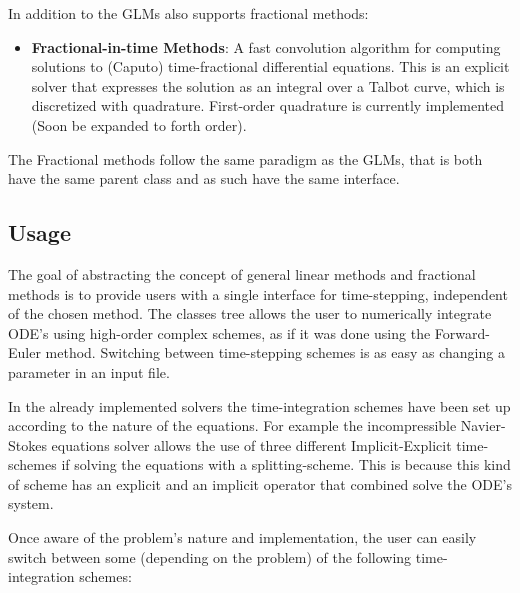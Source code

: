 In addition to the GLMs {\nek} also supports fractional methods:
\begin{itemize}
  \item \textbf{Fractional-in-time Methods}: A fast convolution
    algorithm for computing solutions to (Caputo) time-fractional
    differential equations. This is an explicit solver that expresses
    the solution as an integral over a Talbot curve, which is
    discretized with quadrature. First-order quadrature is currently
    implemented (Soon be expanded to forth order).
\end{itemize}

The Fractional methods follow the same paradigm as the GLMs, that is
both have the same parent class and as such have the same interface.

\subsection{Usage}
The goal of abstracting the concept of general linear methods and
fractional methods is to provide users with a single interface for
time-stepping, independent of the chosen method. The classes tree
allows the user to numerically integrate ODE's using high-order
complex schemes, as if it was done using the Forward-Euler method.
Switching between time-stepping schemes is as easy as changing a
parameter in an input file.

In the already implemented solvers the time-integration schemes have
been set up according to the nature of the equations.  For example the
incompressible Navier-Stokes equations solver allows the use of three
different Implicit-Explicit time-schemes if solving the equations with
a splitting-scheme.  This is because this kind of scheme has an
explicit and an implicit operator that combined solve the ODE's
system.

Once aware of the problem's nature and implementation, the user can
easily switch between some (depending on the problem) of the following
time-integration schemes:

